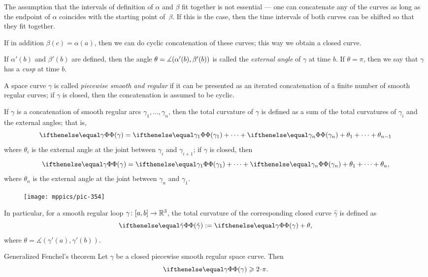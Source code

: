 The assumption that the intervals of definition of $\alpha$ and $\beta$ fit together is not essential --- one can concatenate any of the curves as long as the endpoint of $\alpha$ coincides with the starting point of~$\beta$.
If this is the case, then the time intervals of both curves can be shifted so that they fit together. 

If in addition $\beta(c)=\alpha(a)$, then we can do cyclic concatenation of these curves;
this way we obtain a closed curve.

If $\alpha'(b)$ and $\beta'(b)$ are defined, then the angle $\theta\z=\measuredangle(\alpha'(b),\beta'(b))$ is called the \emph{external angle} of $\gamma$ at time $b$.
If $\theta=\pi$, then we say that $\gamma$ has a \emph{cusp} at  time $b$.

A space curve $\gamma$ is called \emph{piecewise smooth and regular} if it can be presented as an iterated concatenation of a finite number of smooth regular curves; if $\gamma$ is closed, then the  concatenation is assumed to be cyclic.

If $\gamma$ is a concatenation of smooth regular arcs $\gamma_1,\dots,\gamma_n$, then the total curvature of $\gamma$ is defined as a sum of the total curvatures of $\gamma_i$ and the external angles;
that is, 
\[\tc\gamma=\tc{\gamma_1}+\dots+\tc{\gamma_n}+\theta_1+\dots+\theta_{n-1}\]
where $\theta_i$ is the external angle at the joint between $\gamma_i$ and $\gamma_{i+1}$;
if $\gamma$ is closed, then 
\[\tc\gamma=\tc{\gamma_1}+\dots+\tc{\gamma_n}+\theta_1+\dots+\theta_{n},\]
where $\theta_n$ is the external angle at the joint between $\gamma_n$ and $\gamma_1$.

{

\begin{wrapfigure}{r}{23 mm}
\vskip-3mm
\centering
\texttt{[image: mppics/pic-354]}
\end{wrapfigure}

In particular, for a smooth regular loop $\gamma\:[a,b] \z\to \mathbb{R}^3$, the total curvature of the corresponding closed curve $\hat\gamma$ is defined as
\[\tc{\hat\gamma}\df\tc\gamma + \theta,\]
where $\theta=\measuredangle(\gamma'(a),\gamma'(b))$.

}

\begin{thm}{Generalized Fenchel's theorem}\label{thm:gen-fenchel}
Let $\gamma$ be a closed piecewise smooth regular space curve.
Then 
\[\tc\gamma\ge2\cdot\pi.\]

\end{thm}

